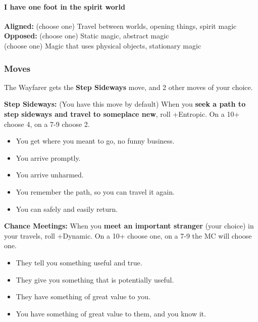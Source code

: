 \documentclass[
]{article}
\providecommand{\tightlist}{%
  \setlength{\itemsep}{0pt}\setlength{\parskip}{0pt}}
\begin{document}
\hypertarget{i-have-one-foot-in-the-spirit-world}{%
\paragraph{I have one foot in the spirit
world}\label{i-have-one-foot-in-the-spirit-world}}

\textbf{Aligned:} (choose one) Travel between worlds, opening things,
spirit magic\\
\textbf{Opposed:} (choose one) Static magic, abstract magic\\
(choose one) Magic that uses physical objects, stationary magic

\hypertarget{moves-8}{%
\subsubsection{Moves}\label{moves-8}}

The Wayfarer gets the \textbf{Step Sideways} move, and 2 other moves of
your choice.

\textbf{Step Sideways:} (You have this move by default) When you
\textbf{seek a path to step sideways and travel to someplace new}, roll
+Entropic. On a 10+ choose 4, on a 7-9 choose 2.

\begin{itemize}
\tightlist
\item
  You get where you meant to go, no funny business.
\item
  You arrive promptly.
\item
  You arrive unharmed.
\item
  You remember the path, so you can travel it again.
\item
  You can safely and easily return.
\end{itemize}

\textbf{Chance Meetings:} When you \textbf{meet an important stranger}
(your choice) in your travels, roll +Dynamic. On a 10+ choose one, on a
7-9 the MC will choose one.

\begin{itemize}
\tightlist
\item
  They tell you something useful and true.
\item
  They give you something that is potentially useful.
\item
  They have something of great value to you.
\item
  You have something of great value to them, and you know it.
\end{itemize}
\end{document}
